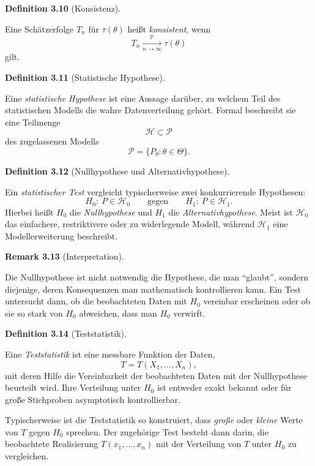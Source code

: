 \documentclass[10pt, letterpaper]{article}
\newcommand{\CustomHeading}[3]{%
  \par\medskip\noindent%
  \textbf{#1 #2} \textnormal{(#3)}.\enskip%
}
\newenvironment{DEF}[2]{\CustomHeading{Definition}{#1}{#2}}{}
\newenvironment{REM}[2]{\CustomHeading{Remark}{#1}{#2}}{}
\begin{document}
\begin{DEF}{3.10}{Konsistenz}
Eine Schätzerfolge \(T_n\) für \(\tau(\theta)\) heißt \emph{konsistent}, wenn
\[
T_n \xrightarrow[n\to\infty]{\mathbb P} \tau(\theta)
\]
gilt.
\end{DEF}


\begin{DEF}{3.11}{Statistische Hypothese}
Eine \emph{statistische Hypothese} ist eine Aussage darüber, zu welchem Teil des statistischen Modells die wahre Datenverteilung gehört. Formal beschreibt sie eine Teilmenge
\[
\mathcal H \subset \mathcal P
\]
des zugelassenen Modells
\[
\mathcal P=\{P_\theta:\theta\in\Theta\}.
\]
\end{DEF}

\begin{DEF}{3.12}{Nullhypothese und Alternativhypothese}
Ein \emph{statistischer Test} vergleicht typischerweise zwei konkurrierende Hypothesen:
\[
H_0:\ P \in \mathcal H_0
\qquad\text{gegen}\qquad
H_1:\ P \in \mathcal H_1.
\]
Hierbei heißt \(H_0\) die \emph{Nullhypothese} und \(H_1\) die \emph{Alternativhypothese}. Meist ist \(\mathcal H_0\) das einfachere, restriktivere oder zu widerlegende Modell, während \(\mathcal H_1\) eine Modellerweiterung beschreibt.
\end{DEF}

\begin{REM}{3.13}{Interpretation}
Die Nullhypothese ist nicht notwendig die Hypothese, die man ``glaubt'', sondern diejenige, deren Konsequenzen man mathematisch kontrollieren kann. Ein Test untersucht dann, ob die beobachteten Daten mit \(H_0\) vereinbar erscheinen oder ob sie so stark von \(H_0\) abweichen, dass man \(H_0\) verwirft.
\end{REM}

\begin{DEF}{3.14}{Teststatistik}
Eine \emph{Teststatistik} ist eine messbare Funktion der Daten,
\[
T=T(X_1,\dots,X_n),
\]
mit deren Hilfe die Vereinbarkeit der beobachteten Daten mit der Nullhypothese beurteilt wird. Ihre Verteilung unter \(H_0\) ist entweder exakt bekannt oder für große Stichproben asymptotisch kontrollierbar.

Typischerweise ist die Teststatistik so konstruiert, dass \emph{große} oder \emph{kleine} Werte von \(T\) gegen \(H_0\) sprechen. Der zugehörige Test besteht dann darin, die beobachtete Realisierung \(T(x_1,\dots,x_n)\) mit der Verteilung von \(T\) unter \(H_0\) zu vergleichen.
\end{DEF}
\end{document}
